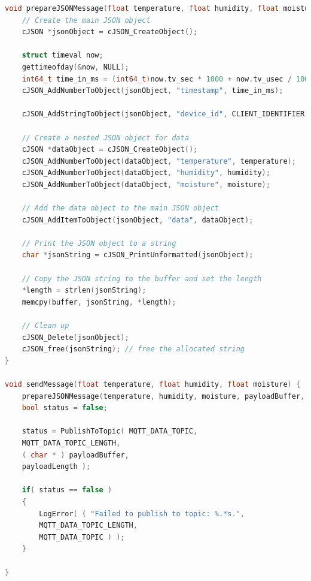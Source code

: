 \begin{lstlisting}[caption={Funkcije za pripremanje JSON objekta i njegovo slanje protokolom MQTT}, language=c]
void prepareJSONMessage(float temperature, float humidity, float moisture, uint8_t *buffer, size_t *length) {
	// Create the main JSON object
	cJSON *jsonObject = cJSON_CreateObject();
	
	struct timeval now;
	gettimeofday(&now, NULL);
	int64_t time_in_ms = (int64_t)now.tv_sec * 1000 + now.tv_usec / 1000;
	cJSON_AddNumberToObject(jsonObject, "timestamp", time_in_ms);
	
	cJSON_AddStringToObject(jsonObject, "device_id", CLIENT_IDENTIFIER);
	
	// Create a nested JSON object for data
	cJSON *dataObject = cJSON_CreateObject();
	cJSON_AddNumberToObject(dataObject, "temperature", temperature);
	cJSON_AddNumberToObject(dataObject, "humidity", humidity);
	cJSON_AddNumberToObject(dataObject, "moisture", moisture);
	
	// Add the data object to the main JSON object
	cJSON_AddItemToObject(jsonObject, "data", dataObject);
	
	// Print the JSON object to a string
	char *jsonString = cJSON_PrintUnformatted(jsonObject);
	
	// Copy the JSON string to the buffer and set the length
	*length = strlen(jsonString);
	memcpy(buffer, jsonString, *length);
	
	// Clean up
	cJSON_Delete(jsonObject);
	cJSON_free(jsonString); // free the allocated string
}

void sendMessage(float temperature, float humidity, float moisture) {
	prepareJSONMessage(temperature, humidity, moisture, payloadBuffer, &payloadLength);
	bool status = false;
	
	status = PublishToTopic( MQTT_DATA_TOPIC,
	MQTT_DATA_TOPIC_LENGTH,
	( char * ) payloadBuffer,
	payloadLength );
	
	if( status == false )
	{
		LogError( ( "Failed to publish to topic: %.*s.",
		MQTT_DATA_TOPIC_LENGTH,
		MQTT_DATA_TOPIC ) );
	}
	
}
\end{lstlisting}

